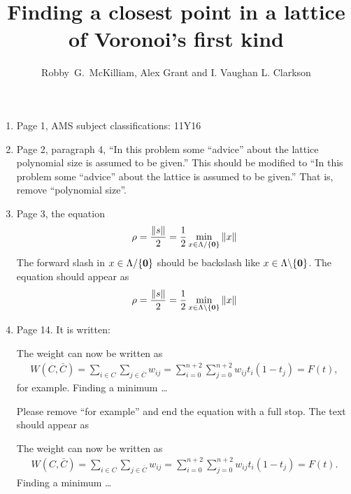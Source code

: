 \documentclass[a4paper,10pt]{article}
\title{Finding a closest point in a lattice of Voronoi's first kind}
\author{Robby~G.~McKilliam, Alex Grant and I. Vaughan L. Clarkson
}
\begin{document}
\begin{enumerate}

\item Page 1, AMS subject classifications: 11Y16

\item Page 2, paragraph 4, ``In this problem some ``advice'' about the lattice polynomial size is assumed to be given.''  This should be modified to ``In this problem some ``advice'' about the lattice is assumed to be given.''  That is, remove ``polynomial size''.

\item Page 3, the equation
\[
\rho = \frac{\|s\|}{2} = \frac{1}{2} \min_{x \in \Lambda / \{\boldsymbol{0}\} } \|x\|
\]
The forward slash in $x \in \Lambda / \{\boldsymbol{0}\}$ should be backslash like $x \in \Lambda \backslash \{\boldsymbol{0}\}$.  The equation should appear as
\[
\rho = \frac{\|s\|}{2} = \frac{1}{2} \min_{x \in \Lambda \backslash \{\boldsymbol{0}\} } \|x\|
\]

\item Page 14.  It is written:

\vspace{0.5cm}
\hspace{1cm}\parbox{10cm}{
The weight can now be written as
\begin{align*}
W(C,\bar{C}) = \sum_{i \in C} \sum_{j \in \bar{C}} w_{ij} = \sum_{i =0}^{n+2} \sum_{j =0}^{n+2} w_{ij} t_i (1 - t_j) = F(t),
\end{align*}
for example. Finding a minimum \dots
}
\vspace{0.5cm}

Please remove ``for example'' and end the equation with a full stop.  The text should appear as

\vspace{0.5cm}
\hspace{1cm}\parbox{10cm}{
The weight can now be written as
\begin{align*}
W(C,\bar{C}) = \sum_{i \in C} \sum_{j \in \bar{C}} w_{ij} = \sum_{i =0}^{n+2} \sum_{j =0}^{n+2} w_{ij} t_i (1 - t_j) = F(t).
\end{align*}
Finding a minimum \dots
}
\vspace{0.5cm}



\end{enumerate}
\end{document}
